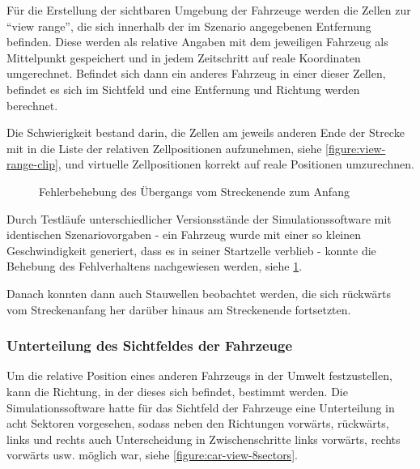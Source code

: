 Für die Erstellung der sichtbaren Umgebung der Fahrzeuge werden die Zellen zur \enquote{view range}, die sich innerhalb der im Szenario angegebenen Entfernung befinden.
Diese werden als relative Angaben mit dem jeweiligen Fahrzeug als Mittelpunkt gespeichert und in jedem Zeitschritt auf reale Koordinaten umgerechnet.
Befindet sich dann ein anderes Fahrzeug in einer dieser Zellen, befindet es sich im Sichtfeld und eine Entfernung und Richtung werden berechnet.

Die Schwierigkeit bestand darin, die Zellen am jeweils anderen Ende der Strecke mit in die Liste der relativen Zellpositionen aufzunehmen, siehe \cref{figure:view-range-clip}, und virtuelle Zellpositionen korrekt auf reale Positionen umzurechnen.

\begin{figure}[hptb]
  \centering
     \qquad 
  \caption[Fehlerbehebung: Übergang vom Streckenende zum Anfang]
          {Fehlerbehebung des Übergangs vom Streckenende zum Anfang}
  \label{figure:go-negative}
\end{figure}

Durch Testläufe unterschiedlicher Versionsstände der Simulationssoftware mit identischen Szenariovorgaben - ein Fahrzeug wurde mit einer so kleinen Geschwindigkeit generiert, dass es in seiner Startzelle verblieb - konnte die Behebung des Fehlverhaltens nachgewiesen werden, siehe \cref{figure:go-negative}.

Danach konnten dann auch Stauwellen beobachtet werden, die sich rückwärts vom Streckenanfang her darüber hinaus am Streckenende fortsetzten.



\subsubsection{Unterteilung des Sichtfeldes der Fahrzeuge}
\label{sec:unterteilung-sichtfeld}

Um die relative Position eines anderen Fahrzeugs in der Umwelt festzustellen, kann die Richtung, in der dieses sich befindet, bestimmt werden.
Die Simulationssoftware hatte für das Sichtfeld der Fahrzeuge eine Unterteilung in acht Sektoren vorgesehen, sodass neben den Richtungen vorwärts, rückwärts, links und rechts auch Unterscheidung in Zwischenschritte links vorwärts, rechts vorwärts usw. möglich war, siehe \cref{figure:car-view-8sectors}.

